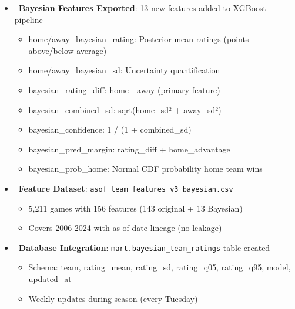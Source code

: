 \begin{itemize}
  \item \done\ \textbf{Bayesian Features Exported}: 13 new features added to XGBoost pipeline
  \begin{itemize}
    \item home/away\_bayesian\_rating: Posterior mean ratings (points above/below average)
    \item home/away\_bayesian\_sd: Uncertainty quantification
    \item bayesian\_rating\_diff: home - away (primary feature)
    \item bayesian\_combined\_sd: sqrt(home\_sd² + away\_sd²)
    \item bayesian\_confidence: 1 / (1 + combined\_sd)
    \item bayesian\_pred\_margin: rating\_diff + home\_advantage
    \item bayesian\_prob\_home: Normal CDF probability home team wins
  \end{itemize}
  \item \done\ \textbf{Feature Dataset}: \texttt{asof\_team\_features\_v3\_bayesian.csv}
  \begin{itemize}
    \item 5,211 games with 156 features (143 original + 13 Bayesian)
    \item Covers 2006-2024 with as-of-date lineage (no leakage)
  \end{itemize}
  \item \done\ \textbf{Database Integration}: \texttt{mart.bayesian\_team\_ratings} table created
  \begin{itemize}
    \item Schema: team, rating\_mean, rating\_sd, rating\_q05, rating\_q95, model, updated\_at
    \item Weekly updates during season (every Tuesday)
  \end{itemize}
\end{itemize}

